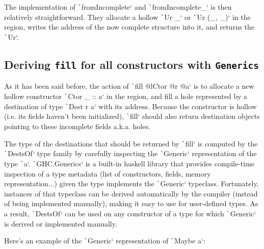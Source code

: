 \documentclass[english]{jflart}
\begin{document}
The implementation of \texttt`fromIncomplete` and \texttt`fromIncomplete_` is then relatively straightforward. They allocate a hollow \texttt`Ur _` or \texttt`Ur (_, _)` in the region, writes the address of the now complete structure into it, and returns the \texttt`Ur`.

\subsection{Deriving \texttt{fill} for all constructors with \texttt{Generics}}


As it has been said before, the action of \texttt`fill @lCtor @r @a` is to allocate a new hollow constructor \texttt`Ctor _ :: a` in the region, and fill a hole represented by a destination of type \texttt`Dest r a` with its address. Because the constructor is hollow (i.e. its fields haven't been initialized), \texttt`fill` should also return destination objects pointing to these incomplete fields a.k.a. holes.

The type of the destinations that should be returned by \texttt`fill` is computed by the \texttt`DestsOf` type family by carefully inspecting the \texttt`Generic` representation of the type \texttt`a`. \texttt`GHC.Generics` is a built-in haskell library that provides compile-time inspection of a type metadata (list of constructors, fields, memory representation...) given the type implements the \texttt`Generic` typeclass. Fortunately, instances of that typeclass can be derived automatically by the compiler (instead of being implemented manually), making it easy to use for user-defined types. As a result, \texttt`DestsOf` can be used on any constructor of a type for which \texttt`Generic` is derived or implemented manually.

Here's an example of the \texttt`Generic` representation of \texttt`Maybe a`:
\end{document}

